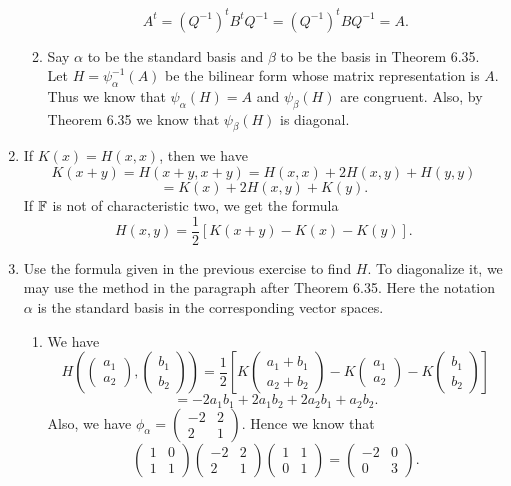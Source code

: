 \begin{enumerate}
\begin{enumerate}
\[A^t=(Q^{-1})^tB^tQ^{-1}=(Q^{-1})^tBQ^{-1}=A.\]
\item Say $\alpha$ to be the standard basis and $\beta$ to be the basis in Theorem 6.35. Let $H=\psi_{\alpha}^{-1}(A)$ be the bilinear form whose matrix representation is $A$.  Thus we know that $\psi_{\alpha}(H)=A$  and $\psi_{\beta}(H)$ are congruent. Also, by Theorem 6.35 we know that $\psi_{\beta}(H)$ is diagonal.
\end{enumerate}
\item If $K(x)=H(x,x)$, then we have 
\[K(x+y)=H(x+y,x+y)=H(x,x)+2H(x,y)+H(y,y)\]
\[=K(x)+2H(x,y)+K(y).\]
If $\mathbb{F}$ is not of characteristic two, we get the formula
\[H(x,y)=\frac{1}{2}[K(x+y)-K(x)-K(y)].\]
\item Use the formula given in the previous exercise to find $H$. To diagonalize it, we may use the method in the paragraph after Theorem 6.35. Here the notation $\alpha$ is the standard basis in the corresponding vector spaces.
\begin{enumerate}
\item We have 
\[H\left(\begin{pmatrix}a_1\\a_2\end{pmatrix},\begin{pmatrix}b_1\\b_2\end{pmatrix}\right)=\frac{1}{2}[K\begin{pmatrix}a_1+b_1\\a_2+b_2\end{pmatrix}-K\begin{pmatrix}a_1\\a_2\end{pmatrix}-K\begin{pmatrix}b_1\\b_2\end{pmatrix}]\]
\[=-2a_1b_1+2a_1b_2+2a_2b_1+a_2b_2.\]
Also, we have $\phi_{\alpha}=\begin{pmatrix}-2&2\\2&1\end{pmatrix}$. Hence we know that 
\[\begin{pmatrix}1&0\\1&1\end{pmatrix}\begin{pmatrix}-2&2\\2&1\end{pmatrix}\begin{pmatrix}1&1\\0&1\end{pmatrix}=\begin{pmatrix}-2&0\\0&3\end{pmatrix}.\]

\end{enumerate}
\end{enumerate}
